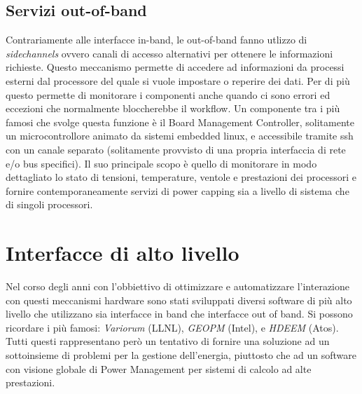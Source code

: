 \subsection{Servizi out-of-band}
Contrariamente alle interfacce in-band, le out-of-band fanno utlizzo di \emph{sidechannels} ovvero canali di accesso alternativi per ottenere le informazioni richieste. Questo meccanismo permette di accedere ad informazioni da processi esterni dal processore del quale si vuole impostare o reperire dei dati. Per di più questo permette di monitorare i componenti anche quando ci sono errori ed eccezioni che normalmente bloccherebbe il workflow. Un componente tra i più famosi che svolge questa funzione è il Board Management Controller, solitamente un microcontrollore animato da sistemi embedded linux, e accessibile tramite ssh con un canale separato (solitamente provvisto di una propria interfaccia di rete e/o bus specifici). Il suo principale scopo è quello di monitorare in modo dettagliato lo stato di tensioni, temperature, ventole e prestazioni dei processori e fornire contemporaneamente servizi di power capping sia a livello di sistema che di singoli processori. 

\section{Interfacce di alto livello}
Nel corso degli anni con l'obbiettivo di ottimizzare e automatizzare l'interazione con questi meccanismi hardware sono stati sviluppati diversi software di più alto livello che utilizzano sia interfacce in band che interfacce out of band. Si possono ricordare i più famosi: \emph{Variorum} (LLNL), \emph{GEOPM} (Intel)\cite{GEOPM}, e \emph{HDEEM} (Atos)\cite{HDEEM}. Tutti questi rappresentano però un tentativo di fornire una soluzione ad un sottoinsieme di problemi per la gestione dell'energia, piuttosto che ad un software con visione globale di Power Management per sistemi di calcolo ad alte prestazioni. %


